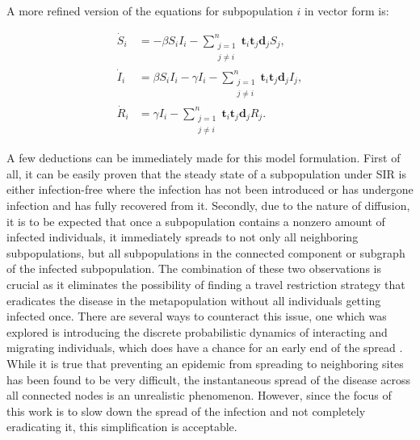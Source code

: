 A more refined version of the equations for subpopulation \( i \) in vector form is:

\begin{align}
    \dot{S}_{i} &= -\beta S_{i} I_{i} - \sum_{\substack{j=1 \\ j \neq i}}^n \mathbf{t}_i \mathbf{t}_j \mathbf{d}_j S_j, \\
    \dot{I}_{i} &= \beta S_{i} I_{i} - \gamma I_{i} - \sum_{\substack{j=1 \\ j \neq i}}^n \mathbf{t}_i \mathbf{t}_j \mathbf{d}_j I_j, \\
    \dot{R}_{i} &= \gamma I_{i} - \sum_{\substack{j=1 \\ j \neq i}}^n \mathbf{t}_i \mathbf{t}_j \mathbf{d}_j R_j.
\end{align}

A few deductions can be immediately made for this model formulation. First of all, it can be easily  proven that the steady state of a subpopulation under SIR is either infection-free where the infection has not been introduced or has undergone infection and has fully recovered from it. Secondly, due to the nature of diffusion, it is to be expected that once a subpopulation contains a nonzero amount of infected individuals, it immediately spreads to not only all neighboring subpopulations, but all subpopulations in the connected component or subgraph of the infected subpopulation. The combination of these two observations is crucial as it eliminates the possibility of finding a travel restriction strategy that eradicates the disease in the metapopulation without all individuals getting infected once. There are several ways to counteract this issue, one which was explored is introducing the discrete probabilistic dynamics of interacting and migrating individuals, which does have a chance for an early end of the spread \cite{colizza2008epidemic}. While it is true that preventing an epidemic  from spreading to neighboring sites has been found to be very difficult, the instantaneous spread of the disease across all connected nodes is an unrealistic phenomenon. However, since the focus of this work is to slow down the spread of the infection and not completely eradicating it, this simplification is acceptable. \\

